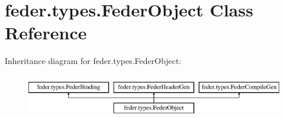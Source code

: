 \hypertarget{classfeder_1_1types_1_1FederObject}{}\section{feder.\+types.\+Feder\+Object Class Reference}
\label{classfeder_1_1types_1_1FederObject}
Inheritance diagram for feder.\+types.\+Feder\+Object\+:\begin{figure}[H]
\begin{center}
\leavevmode
\includegraphics[height=1.964912cm]{classfeder_1_1types_1_1FederObject}
\end{center}
\end{figure}
